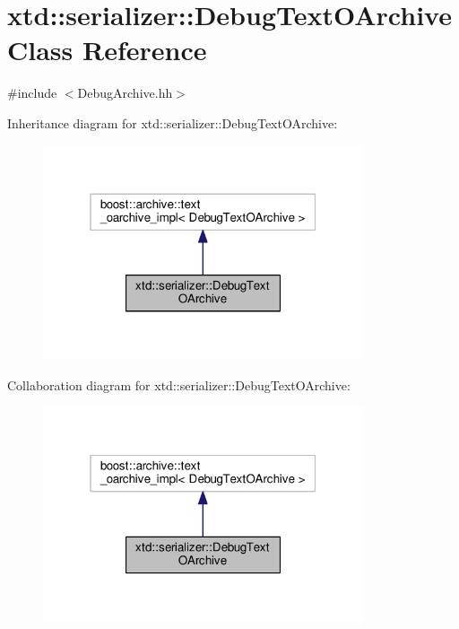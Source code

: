 \hypertarget{classxtd_1_1serializer_1_1DebugTextOArchive}{\section{xtd\-:\-:serializer\-:\-:Debug\-Text\-O\-Archive Class Reference}
\label{classxtd_1_1serializer_1_1DebugTextOArchive}
}


{\ttfamily \#include $<$Debug\-Archive.\-hh$>$}



Inheritance diagram for xtd\-:\-:serializer\-:\-:Debug\-Text\-O\-Archive\-:
\nopagebreak
\begin{figure}[H]
\begin{center}
\leavevmode
\includegraphics[width=268pt]{classxtd_1_1serializer_1_1DebugTextOArchive__inherit__graph}
\end{center}
\end{figure}


Collaboration diagram for xtd\-:\-:serializer\-:\-:Debug\-Text\-O\-Archive\-:
\nopagebreak
\begin{figure}[H]
\begin{center}
\leavevmode
\includegraphics[width=268pt]{classxtd_1_1serializer_1_1DebugTextOArchive__coll__graph}
\end{center}
\end{figure}
